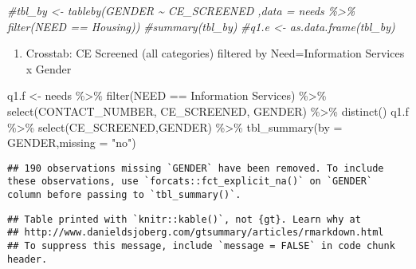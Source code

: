 \documentclass[
]{article}
\newenvironment{Shaded}{\begin{snugshade}}{\end{snugshade}}
\newcommand{\AttributeTok}[1]{\textcolor[rgb]{0.77,0.63,0.00}{#1}}
\newcommand{\CommentTok}[1]{\textcolor[rgb]{0.56,0.35,0.01}{\textit{#1}}}
\newcommand{\FunctionTok}[1]{\textcolor[rgb]{0.00,0.00,0.00}{#1}}
\newcommand{\NormalTok}[1]{#1}
\newcommand{\OtherTok}[1]{\textcolor[rgb]{0.56,0.35,0.01}{#1}}
\newcommand{\SpecialCharTok}[1]{\textcolor[rgb]{0.00,0.00,0.00}{#1}}
\newcommand{\StringTok}[1]{\textcolor[rgb]{0.31,0.60,0.02}{#1}}
\providecommand{\tightlist}{%
  \setlength{\itemsep}{0pt}\setlength{\parskip}{0pt}}
\begin{document}
\begin{Shaded}
\begin{Highlighting}[]
\CommentTok{\#tbl\_by \textless{}{-} tableby(GENDER \textasciitilde{} CE\_SCREENED ,data = needs \%\textgreater{}\% filter(NEED == \textquotesingle{}Housing\textquotesingle{}))}
\CommentTok{\#summary(tbl\_by)}
\CommentTok{\#q1.e \textless{}{-} as.data.frame(tbl\_by)}
\end{Highlighting}
\end{Shaded}

\begin{enumerate}
\def\labelenumi{\alph{enumi}.}
\setcounter{enumi}{5}
\tightlist
\item
  Crosstab: CE Screened (all categories) filtered by Need=Information
  Services x Gender
\end{enumerate}

\begin{Shaded}
\begin{Highlighting}[]
\NormalTok{q1.f }\OtherTok{\textless{}{-}}\NormalTok{ needs }\SpecialCharTok{\%\textgreater{}\%} \FunctionTok{filter}\NormalTok{(NEED }\SpecialCharTok{==} \StringTok{\textquotesingle{}Information Services\textquotesingle{}}\NormalTok{) }\SpecialCharTok{\%\textgreater{}\%} \FunctionTok{select}\NormalTok{(CONTACT\_NUMBER, CE\_SCREENED, GENDER) }\SpecialCharTok{\%\textgreater{}\%} \FunctionTok{distinct}\NormalTok{()}
\NormalTok{q1.f }\SpecialCharTok{\%\textgreater{}\%} \FunctionTok{select}\NormalTok{(CE\_SCREENED,GENDER) }\SpecialCharTok{\%\textgreater{}\%} \FunctionTok{tbl\_summary}\NormalTok{(}\AttributeTok{by =}\NormalTok{ GENDER,}\AttributeTok{missing =} \StringTok{"no"}\NormalTok{)}
\end{Highlighting}
\end{Shaded}

\begin{verbatim}
## 190 observations missing `GENDER` have been removed. To include these observations, use `forcats::fct_explicit_na()` on `GENDER` column before passing to `tbl_summary()`.
\end{verbatim}

\begin{verbatim}
## Table printed with `knitr::kable()`, not {gt}. Learn why at
## http://www.danieldsjoberg.com/gtsummary/articles/rmarkdown.html
## To suppress this message, include `message = FALSE` in code chunk header.
\end{verbatim}
\end{document}
